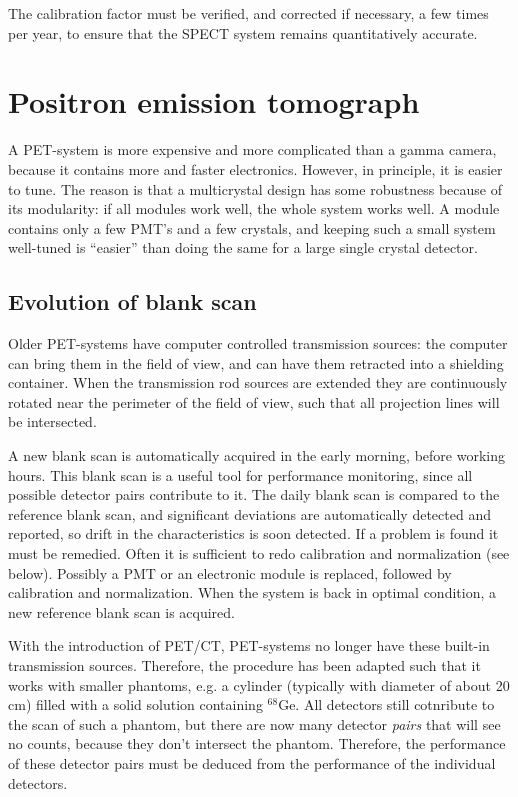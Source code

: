 The calibration factor must be verified, and corrected if necessary, a
few times per year, to ensure that the SPECT system remains
quantitatively accurate.

\section{Positron emission tomograph}
A PET-system is more expensive and more complicated than a gamma camera,
because it contains more and faster electronics. However, in principle,
it is easier to tune. The reason is that a multicrystal design has some
robustness because of its modularity: if all modules work well, the whole
system works well. A module contains only a few PMT's and a few crystals, and
keeping such a small system well-tuned is ``easier'' than doing the same for a
large single crystal detector.

\subsection{Evolution of blank scan}
Older PET-systems have computer controlled transmission sources: the
computer can bring them in the field of view, and can have them
retracted into a shielding container. When the transmission rod
sources are extended they are continuously rotated near the perimeter
of the field of view, such that all projection lines will be
intersected.

A new blank scan is automatically acquired in the early morning,
before working hours. This blank scan is a useful tool for performance
monitoring, since all possible detector pairs contribute to it.  The
daily blank scan is compared to the reference blank scan, and
significant deviations are automatically detected and reported, so
drift in the characteristics is soon detected. If a problem is found
it must be remedied. Often it is sufficient to redo calibration and
normalization (see below). Possibly a PMT or an electronic module is
replaced, followed by calibration and normalization. When the system
is back in optimal condition, a new reference blank scan is acquired.

With the introduction of PET/CT, PET-systems no longer have these
built-in transmission sources. Therefore, the procedure has been
adapted such that it works with smaller phantoms, e.g. a cylinder
(typically with diameter of about 20 cm) filled with a solid solution
containing $^{68}$Ge. All detectors still cotnribute to the scan of
such a phantom, but there are now many detector {\em pairs} that will
see no counts, because they don't intersect the phantom. Therefore,
the performance of these detector pairs must be deduced from the
performance of the individual detectors.


